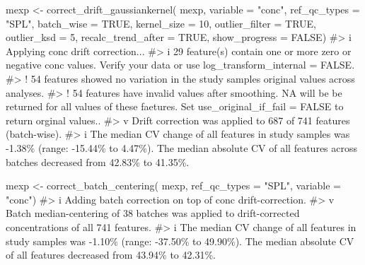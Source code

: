 \documentclass[
  letterpaper,
  DIV=11,
  numbers=noendperiod]{scrartcl}
\newenvironment{Shaded}{\begin{snugshade}}{\end{snugshade}}
\newcommand{\AttributeTok}[1]{\textcolor[rgb]{0.40,0.45,0.13}{#1}}
\newcommand{\CommentTok}[1]{\textcolor[rgb]{0.37,0.37,0.37}{#1}}
\newcommand{\ConstantTok}[1]{\textcolor[rgb]{0.56,0.35,0.01}{#1}}
\newcommand{\DecValTok}[1]{\textcolor[rgb]{0.68,0.00,0.00}{#1}}
\newcommand{\FunctionTok}[1]{\textcolor[rgb]{0.28,0.35,0.67}{#1}}
\newcommand{\NormalTok}[1]{\textcolor[rgb]{0.00,0.23,0.31}{#1}}
\newcommand{\OtherTok}[1]{\textcolor[rgb]{0.00,0.23,0.31}{#1}}
\newcommand{\StringTok}[1]{\textcolor[rgb]{0.13,0.47,0.30}{#1}}
\begin{document}
\begin{Shaded}
\begin{Highlighting}[]
\NormalTok{mexp }\OtherTok{\textless{}{-}} \FunctionTok{correct\_drift\_gaussiankernel}\NormalTok{(}
\NormalTok{  mexp, }
  \AttributeTok{variable =} \StringTok{"conc"}\NormalTok{, }
  \AttributeTok{ref\_qc\_types =} \StringTok{"SPL"}\NormalTok{, }
  \AttributeTok{batch\_wise =} \ConstantTok{TRUE}\NormalTok{, }
  \AttributeTok{kernel\_size =} \DecValTok{10}\NormalTok{, }
  \AttributeTok{outlier\_filter =} \ConstantTok{TRUE}\NormalTok{, }
  \AttributeTok{outlier\_ksd =} \DecValTok{5}\NormalTok{, }
  \AttributeTok{recalc\_trend\_after =} \ConstantTok{TRUE}\NormalTok{, }
  \AttributeTok{show\_progress =} \ConstantTok{FALSE}\NormalTok{) }
\CommentTok{\#\textgreater{} i Applying \textasciigrave{}conc\textasciigrave{} drift correction...}
\CommentTok{\#\textgreater{} i 29 feature(s) contain one or more zero or negative \textasciigrave{}conc\textasciigrave{} values. Verify your data or use \textasciigrave{}log\_transform\_internal = FALSE\textasciigrave{}.}
\CommentTok{\#\textgreater{} ! 54 features showed no variation in the study sample\textquotesingle{}s original values across analyses.}
\CommentTok{\#\textgreater{} ! 54 features have invalid values after smoothing. NA will be be returned for all values of these faetures. Set \textasciigrave{}use\_original\_if\_fail = FALSE to return orginal values..}
\CommentTok{\#\textgreater{} v Drift correction was applied to 687 of 741 features (batch{-}wise).}
\CommentTok{\#\textgreater{} i The median CV change of all features in study samples was {-}1.38\% (range: {-}15.44\% to 4.47\%). The median absolute CV of all features across batches decreased from 42.83\% to 41.35\%.}

\NormalTok{mexp }\OtherTok{\textless{}{-}} \FunctionTok{correct\_batch\_centering}\NormalTok{(}
\NormalTok{  mexp, }
  \AttributeTok{ref\_qc\_types =} \StringTok{"SPL"}\NormalTok{, }
  \AttributeTok{variable =} \StringTok{"conc"}\NormalTok{)}
\CommentTok{\#\textgreater{} i Adding batch correction on top of \textasciigrave{}conc\textasciigrave{} drift{-}correction.}
\CommentTok{\#\textgreater{} v Batch median{-}centering of 38 batches was applied to drift{-}corrected concentrations of all 741 features.}
\CommentTok{\#\textgreater{} i The median CV change of all features in study samples was {-}1.10\% (range: {-}37.50\% to 49.90\%).  The median absolute CV of all features decreased from 43.94\% to 42.31\%.}
\end{Highlighting}
\end{Shaded}
\end{document}
